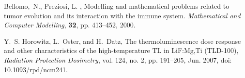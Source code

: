 
\begin{thebibliography}{999}


 Bellomo,~N., Preziosi, L. , Modelling and mathematical problems
related to tumor evolution and its interaction with the immune
system. \textit{Mathematical and Computer Modelling}, \textbf{32},  pp. 413--452, 2000.

 Y.~S. Horowitz, L.~Oster, and H.~Datz, The thermoluminescence dose response and other characteristics of the high-temperature TL in LiF:Mg,Ti (TLD-100), \textit{Radiation Protection Dosimetry}, vol. 124, no. 2, pp. 191--205, Jun. 2007, doi: 10.1093/rpd/ncm241.


\end{thebibliography}